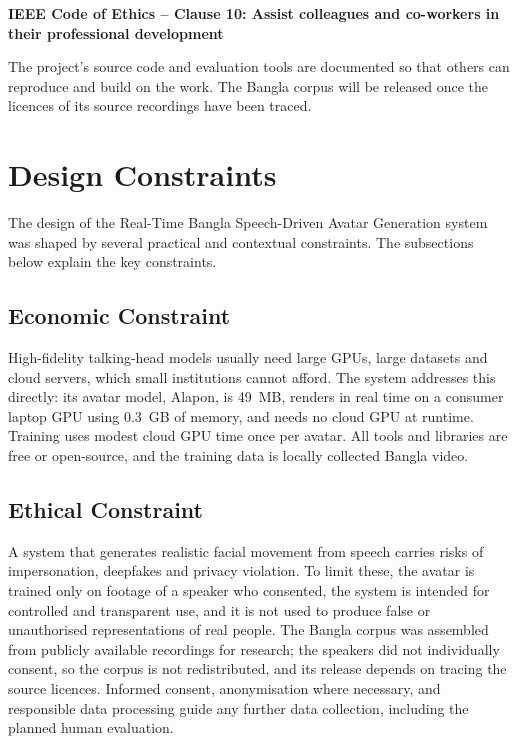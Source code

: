 \vspace{0.5cm}


\textbf{IEEE Code of Ethics -- Clause 10: Assist colleagues and co-workers in their professional development}

\noindent
The project's source code and evaluation tools are documented so that others can reproduce and build on the work. The Bangla corpus will be released once the licences of its source recordings have been traced.




\section{Design Constraints}

The design of the Real-Time Bangla Speech-Driven Avatar Generation system was shaped by several practical and contextual constraints. The subsections below explain the key constraints.\\

\subsection{Economic Constraint}
High-fidelity talking-head models usually need large GPUs, large datasets and cloud servers, which small institutions cannot afford. The system addresses this directly: its avatar model, Alapon, is 49~MB, renders in real time on a consumer laptop GPU using 0.3~GB of memory, and needs no cloud GPU at runtime. Training uses modest cloud GPU time once per avatar. All tools and libraries are free or open-source, and the training data is locally collected Bangla video.

\subsection{Ethical Constraint}
A system that generates realistic facial movement from speech carries risks of impersonation, deepfakes and privacy violation. To limit these, the avatar is trained only on footage of a speaker who consented, the system is intended for controlled and transparent use, and it is not used to produce false or unauthorised representations of real people. The Bangla corpus was assembled from publicly available recordings for research; the speakers did not individually consent, so the corpus is not redistributed, and its release depends on tracing the source licences. Informed consent, anonymisation where necessary, and responsible data processing guide any further data collection, including the planned human evaluation.


